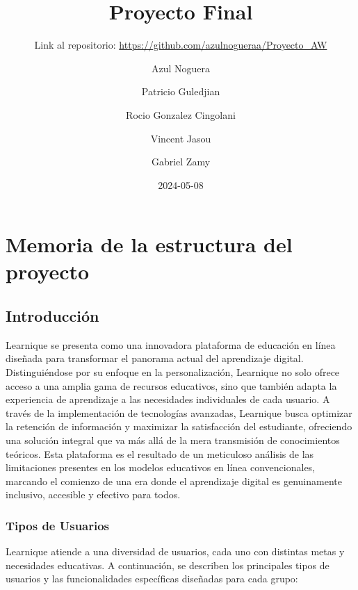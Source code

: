 \documentclass[
]{article}
\title{Proyecto Final}
\subtitle{Link al repositorio:
\url{https://github.com/azulnogueraa/Proyecto_AW}}
\author{Azul Noguera \and Patricio Guledjian \and Rocio Gonzalez
Cingolani \and Vincent Jasou \and Gabriel Zamy}
\date{2024-05-08}
\begin{document}
\maketitle

{
\setcounter{tocdepth}{3}
\tableofcontents
}
\newpage

\section*{Memoria de la estructura del proyecto}

\subsection{Introducción}\label{introducciuxf3n}

Learnique se presenta como una innovadora plataforma de educación en
línea diseñada para transformar el panorama actual del aprendizaje
digital. Distinguiéndose por su enfoque en la personalización, Learnique
no solo ofrece acceso a una amplia gama de recursos educativos, sino que
también adapta la experiencia de aprendizaje a las necesidades
individuales de cada usuario. A través de la implementación de
tecnologías avanzadas, Learnique busca optimizar la retención de
información y maximizar la satisfacción del estudiante, ofreciendo una
solución integral que va más allá de la mera transmisión de
conocimientos teóricos. Esta plataforma es el resultado de un meticuloso
análisis de las limitaciones presentes en los modelos educativos en
línea convencionales, marcando el comienzo de una era donde el
aprendizaje digital es genuinamente inclusivo, accesible y efectivo para
todos.

\subsubsection{Tipos de Usuarios}\label{tipos-de-usuarios}

Learnique atiende a una diversidad de usuarios, cada uno con distintas
metas y necesidades educativas. A continuación, se describen los
principales tipos de usuarios y las funcionalidades específicas
diseñadas para cada grupo:
\end{document}
